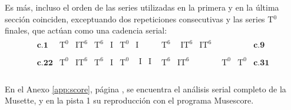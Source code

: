 		Es más, incluso el orden de las series utilizadas en la primera y en la última sección coinciden, exceptuando dos repeticiones consecutivas y las series T$^0$ finales, que actúan como una cadencia serial:
		$$\begin{matrix}\mathbf{c}.\mathbf{1}&\text{T}^0&\text{IT}^6&\text{T}^6&\text{I}&\text{T}^0&\text{I}&\text{T}^6&\begin{matrix}\text{IT}^6&\text{IT}^6\\\end{matrix}&&&\mathbf{c}.\mathbf{9}\\\mathbf{c}.\mathbf{22}&\text{T}^0&\text{IT}^6&\text{T}^6&\text{I}&\text{T}^0&\begin{matrix}\text{I}&\text{I}\\\end{matrix}&\text{T}^6&\text{IT}^6&\text{T}^0&\text{T}^0&\mathbf{c}.\mathbf{31}\\\end{matrix}$$
		
		En el Anexo \ref{app:score}, página \pageref{app:score}, se encuentra el análisis serial completo de la Musette, y en la pista 1 su reproducción con el programa Musescore.